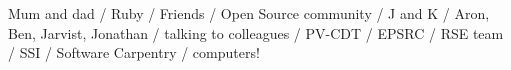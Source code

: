 Mum and dad / Ruby / Friends / Open Source community / J and K / Aron, Ben, Jarvist, Jonathan / talking to colleagues / PV-CDT / EPSRC / RSE team / SSI / Software Carpentry / computers!